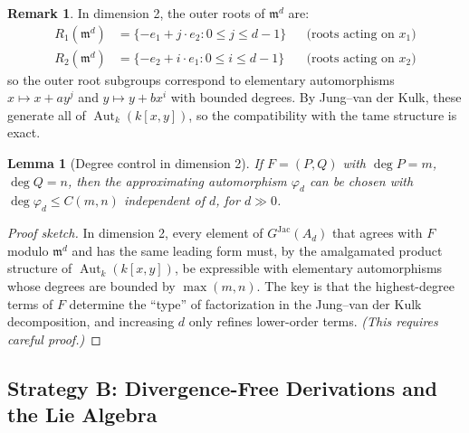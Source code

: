 \documentclass[12pt,a4paper]{article}
\newtheorem{lemma}[theorem]{Lemma}
\theoremstyle{definition}
\newtheorem{remark}[theorem]{Remark}
\newcommand{\kk}{k}
\newcommand{\pp}{\mathfrak{m}}
\newcommand{\Aut}{\operatorname{Aut}}
\newcommand{\GJac}{G^{\mathrm{Jac}}}
\begin{document}
\begin{remark}
In dimension 2, the outer roots of $\pp^d$ are:
\begin{align*}
  R_1(\pp^d) &= \{-e_1 + j \cdot e_2 : 0 \leq j \leq d-1\} &
  &\text{(roots acting on $x_1$)}\\
  R_2(\pp^d) &= \{-e_2 + i \cdot e_1 : 0 \leq i \leq d-1\} &
  &\text{(roots acting on $x_2$)}
\end{align*}
so the outer root subgroups correspond to elementary automorphisms
$x \mapsto x + a y^j$ and $y \mapsto y + b x^i$ with bounded degrees.
By Jung--van der Kulk, these generate all of $\Aut_\kk(\kk[x,y])$, so the compatibility
with the tame structure is exact.
\end{remark}

\begin{lemma}[Degree control in dimension 2]
If $F = (P,Q)$ with $\deg P = m$, $\deg Q = n$, then the approximating automorphism
$\varphi_d$ can be chosen with $\deg \varphi_d \leq C(m,n)$ independent of $d$, for
$d \gg 0$.
\end{lemma}

\begin{proof}[Proof sketch]
In dimension 2, every element of $\GJac(A_d)$ that agrees with $F$ modulo $\pp^d$ and has
the same leading form must, by the amalgamated product structure of $\Aut_\kk(\kk[x,y])$,
be expressible with elementary automorphisms whose degrees are bounded by
$\max(m,n)$. The key is that the highest-degree terms of $F$ determine the ``type'' of
factorization in the Jung--van der Kulk decomposition, and increasing $d$ only refines
lower-order terms. \emph{(This requires careful proof.)}
\end{proof}

\subsection{Strategy B: Divergence-Free Derivations and the Lie Algebra}
\end{document}
